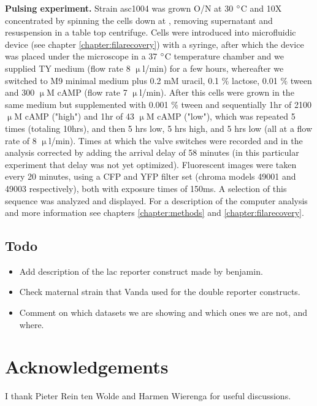 \textbf{Pulsing experiment.} Strain asc1004 was grown O/N at 30 $\degree$C and 10X concentrated by spinning the cells down at , removing supernatant and resuspension in a table top centrifuge.
Cells were introduced into microfluidic device  (see chapter \ref{chapter:filarecovery}) with a syringe, after which the device was placed under the microscope in a 37 $\degree$C temperature chamber and we supplied TY medium (flow rate 8 $\upmu$l/min) for a few hours, whereafter we switched to M9 minimal medium plus 0.2 mM uracil, 0.1 $\%$ lactose, 0.01 $\%$ tween and 300 $\upmu$M cAMP (flow rate 7 $\upmu$l/min).
After this cells were grown in the same medium but supplemented with 0.001 $\%$ tween and sequentially 1hr of 2100 $\upmu$M cAMP ("high") and 1hr of 43 $\upmu$M cAMP ("low"), which was repeated 5 times (totaling 10hrs), and then 5 hrs low, 5 hrs high, and 5 hrs low (all at a flow rate of 8 $\upmu$l/min). 
Times at which the valve switches were recorded and in the analysis corrected by adding the arrival delay of 58 minutes (in this particular experiment that delay was not yet optimized).
Fluorescent images were taken every 20 minutes, using a CFP and YFP filter set (chroma models 49001 and 49003 respectively), both with exposure times of 150ms.
A selection of this sequence was analyzed and displayed.  
For a description of the computer analysis and more information see chapters \ref{chapter:methods} and \ref{chapter:filarecovery}.

\subsection*{Todo}

\begin{itemize}
	\item Add description of the lac reporter construct made by benjamin.
	\item Check maternal strain that Vanda used for the double reporter constructs.
	\item Comment on which datasets we are showing and which ones we are not, and where.
\end{itemize}


\section*{Acknowledgements}

I thank Pieter Rein ten Wolde and Harmen Wierenga for useful discussions.

